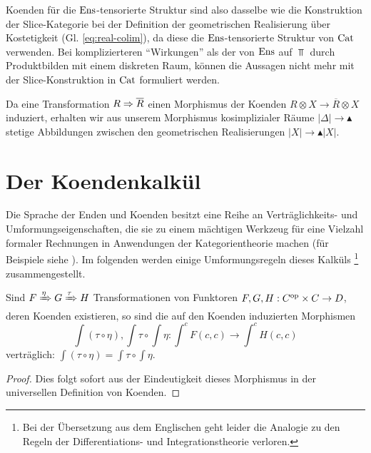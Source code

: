 \begin{bem}
  Koenden für die $\operatorname{Ens}$-tensorierte Struktur sind also dasselbe wie
  die Konstruktion der Slice-Kategorie bei der Definition der
  geometrischen Realisierung über Kostetigkeit
  (Gl. \ref{eq:real-colim}), da diese die $\operatorname{Ens}$-tensorierte Struktur
  von $\operatorname{Cat}$ verwenden. Bei komplizierteren ``Wirkungen'' als der von
  $\operatorname{Ens}$ auf $\Top$ durch Produktbilden mit einem diskreten Raum,
  können die Aussagen nicht mehr mit der Slice-Konstruktion in $\operatorname{Cat}$
  formuliert werden.
\end{bem}
\begin{bem} \label{real-model-natural}
  Da eine Transformation $R \Rightarrow \overline{R}$ einen Morphismus der
  Koenden $R \otimes X \to \overline{R} \otimes X$ induziert, erhalten
  wir aus unserem Morphismus kosimplizialer Räume $|\Delta| \to
  \blacktriangle$ stetige Abbildungen zwischen den geometrischen
  Realisierungen $|X| \to \blacktriangle |X|$.
\end{bem}

\section{Der Koendenkalkül}
\label{sec:coend-calc}

Die Sprache der Enden und Koenden besitzt eine Reihe an
Verträglichkeits- und Umformungseigenschaften, die sie zu einem
mächtigen Werkzeug für eine Vielzahl formaler Rechnungen in
Anwendungen der Kategorientheorie machen (für Beispiele siehe
\cite{Lore}). Im folgenden werden einige Umformungsregeln dieses
Kalküls \footnote{Bei der Übersetzung aus dem Englischen geht leider
  die Analogie zu den Regeln der Differentiations- und
  Integrationstheorie verloren.}  zusammengestellt.

\begin{lemma}
  Sind $F \xRightarrow{\eta} G \xRightarrow{\tau} H$ Transformationen
  von Funktoren $F, G, H: C^\mathrm{op} \times C \to D$, deren Koenden
  existieren, so sind die auf den Koenden induzierten Morphismen
  \[ \int (\tau \circ \eta), \int \tau \circ \int \eta:
  \int^c F(c, c) \to \int^c H(c, c) \]
  verträglich: $\int (\tau \circ \eta) = \int \tau \circ \int \eta$.
\end{lemma}
\begin{proof}
  Dies folgt sofort aus der Eindeutigkeit dieses Morphismus in der
  universellen Definition von Koenden.
\end{proof}


